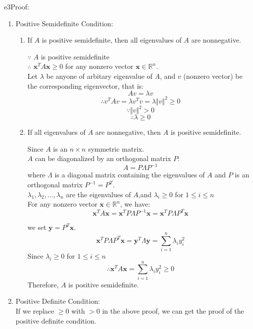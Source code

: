 \documentclass{article}
\begin{document}
\begin{PROOF}{e3}Proof:
\begin{enumerate}
	\item Positive Semidefinite Condition:
		\begin{enumerate}
			\item If \(A\) is positive semidefinite, then all eigenvalues of \(A\) are nonnegative.
		
			\(\because\) \(A\) is positive semidefinite\\
			\(\therefore\) \(\mathbf{x}^T A \mathbf{x} \geq 0\) for any nonzero vector \(\mathbf{x} \in \mathbb{R}^n\).\\
			Let \(\lambda\) be anyone of arbitary eigenvalue of \(A\), and \(v\) (nonzero vector) be the corresponding eigenvector, that is:\\
			\[
			Av = \lambda v
			\]
			\[
			\therefore v^{T}Av = \lambda v^{T}v = \lambda \Vert v \Vert^2 \ge 0 
			\]
			\[
			\because \Vert v \Vert^2 > 0 
			\]
			\[
			\therefore \lambda \geq 0
			\]
		\item  If all eigenvalues of \(A\) are nonnegative, then \(A\) is positive semidefinite.
		
		Since \(A\) is an \(n \times n\) symmetric matrix.\\
		\(A\) can be diagonalized by an orthogonal matrix \(P\):
		$$A = P \Lambda P^{-1}$$
		where \(\Lambda\) is a diagonal matrix containing the eigenvalues of \(A\) and \(P\) is an orthogonal matrix \(P^{-1} =P^{T}\).\\
		\(\lambda_1, \lambda_2, \dots, \lambda_n\) are the eigenvalues of \(A\),and \(\lambda_i \ge 0\) for \(1 \le i \le n \)\\
		For any nonzero vector \(\mathbf{x} \in \mathbb{R}^n\), we have:
		\[
		\mathbf{x}^T A \mathbf{x} = \mathbf{x}^T P \Lambda P^{-1} \mathbf{x} = \mathbf{x}^T P \Lambda P^{T} \mathbf{x}
		\]
		
		we set \(\mathbf{y} = P^T \mathbf{x}\).
		\[
		\mathbf{x}^T P \Lambda P^{T} \mathbf{x} = \mathbf{y}^T \Lambda \mathbf{y} = \sum_{i=1}^n \lambda_i y_{i}^2 
		\]
		Since \(\lambda_i \ge 0\) for \(1 \le i \le n \)
		\[\therefore \mathbf{x}^T A \mathbf{x} = \sum_{i=1}^n \lambda_i y_{i}^2 \ge 0\]
		Therefore, \(A\) is positive semidefinite.
		\end{enumerate}	
	\item Positive Definite Condition:\\
		If we replace \(\ge 0\) with \(> 0\) in the above proof, we can get the proof of the positive definite condition.\\
\end{enumerate}	
\end{PROOF}
\end{document}
